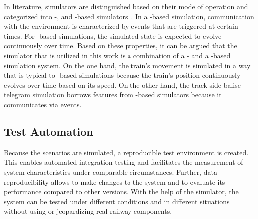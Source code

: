 In literature, simulators are distinguished based on their mode of operation and categorized into -, and -based simulators~\cite{CoSimulationStateOfTheArt}.
In a -based simulation, communication with the environment is characterized by events that are triggered at certain times.
For -based simulations, the simulated state is expected to evolve continuously over time.
Based on these properties, it can be argued that the simulator that is utilized in this work is a combination of a - and a -based simulation system.
On the one hand, the train's movement is simulated in a way that is typical to -based simulations because the train's position continuously evolves over time based on its speed.
On the other hand, the track-side balise telegram simulation borrows features from -based simulators because it communicates via events.

\subsection{Test Automation}
\label{subsec:testautomation}

Because the scenarios are simulated, a reproducible test environment is created.
This enables automated integration testing and facilitates the measurement of system characteristics under comparable circumstances.
Further, data reproducibility allows to make changes to the system and to evaluate its performance compared to other versions.
With the help of the simulator, the system can be tested under different conditions and in different situations without using or jeopardizing real railway components.
\\

